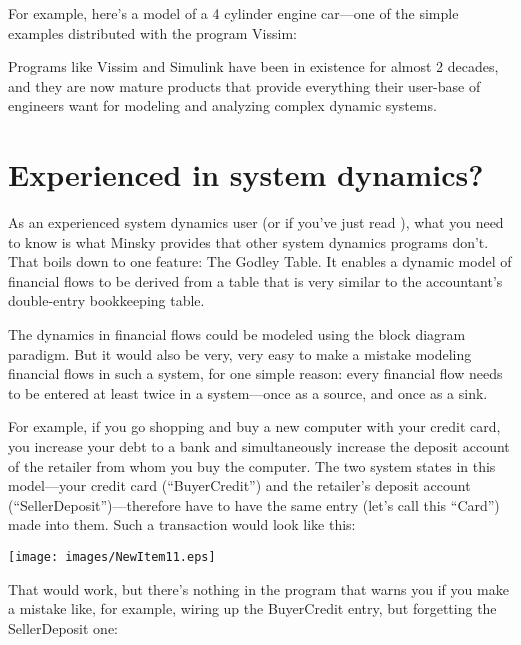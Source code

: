 For example, here's a model of a 4 cylinder engine car---one of the
simple examples distributed with the program Vissim:

\begin{center}
\end{center}

Programs like Vissim and Simulink have been in existence for almost 2
decades, and they are now mature products that provide everything
their user-base of engineers want for modeling and analyzing complex
dynamic systems. 

\section{Experienced in system dynamics?}
\label{intro:experienced}

As an experienced system dynamics user (or if you've just read ), what you need to know is what Minsky
provides that other system dynamics programs don't. That boils down to
one feature: The Godley Table. It enables a dynamic model of
financial flows to be derived from a table that is very similar to the
accountant's double-entry bookkeeping table.


The dynamics in financial flows could be modeled using the block diagram
paradigm. But it would also be very, very easy to make a mistake
modeling financial flows in such a system, for one simple reason:
every financial flow needs to be entered at least twice in a
system---once as a source, and once as a sink.


For example, if you go shopping and buy a new computer with your
credit card, you increase your debt to a bank and simultaneously
increase the deposit account of the retailer from whom you buy the
computer. The two system states in this model---your credit card
(``BuyerCredit'') and the retailer's deposit account
(``SellerDeposit'')---therefore have to have the same entry (let's call
this ``Card'') made into them. Such a transaction would look
like this:


\begin{center}
\texttt{[image: images/NewItem11.eps]}
\end{center}

That would work, but there's nothing in the program that warns you if
you make a mistake like, for example, wiring up the BuyerCredit entry,
but forgetting the SellerDeposit one:

